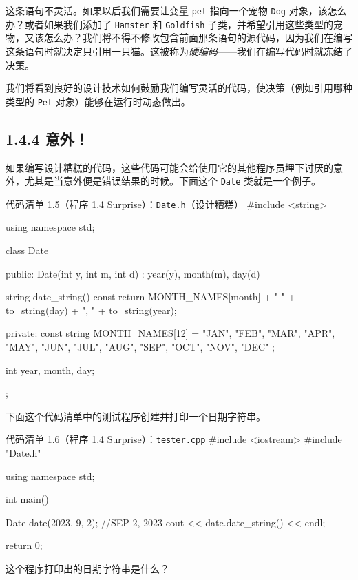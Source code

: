 这条语句不灵活。如果以后我们需要让变量 \texttt{pet} 指向一个宠物 \texttt{Dog} 对象，该怎么办？或者如果我们添加了 \texttt{Hamster} 和 \texttt{Goldfish} 子类，并希望引用这些类型的宠物，又该怎么办？我们将不得不修改包含前面那条语句的源代码，因为我们在编写这条语句时就决定只引用一只猫。这被称为\emph{硬编码}——我们在编写代码时就冻结了决策。

我们将看到良好的设计技术如何鼓励我们编写灵活的代码，使决策（例如引用哪种类型的 \texttt{Pet} 对象）能够在运行时动态做出。

\subsection{1.4.4 意外！}

如果编写设计糟糕的代码，这些代码可能会给使用它的其他程序员埋下讨厌的意外，尤其是当意外便是错误结果的时候。下面这个 \texttt{Date} 类就是一个例子。

\begin{codeboxt}{代码清单 1.5（程序 1.4 Surprise）：\texttt{Date.h}（设计糟糕）}
#include <string>

using namespace std;

class Date
{
public:
    Date(int y, int m, int d) : year(y), month(m), day(d) {}
        
    string date_string() const
    {
        return MONTH_NAMES[month] + " "  + to_string(day)
                                  + ", " + to_string(year);
    }
        
private:
    const string MONTH_NAMES[12] =
    {
        "JAN", "FEB", "MAR", "APR", "MAY", "JUN",
        "JUL", "AUG", "SEP", "OCT", "NOV", "DEC"
    };
        
    int year, month, day;
};
\end{codeboxt}

下面这个代码清单中的测试程序创建并打印一个日期字符串。

\begin{codeboxt}{代码清单 1.6（程序 1.4 Surprise）：\texttt{tester.\allowbreak{}cpp}}
#include <iostream>
#include "Date.h"

using namespace std;

int main()
{
    Date date(2023, 9, 2);  //SEP 2, 2023
    cout << date.date_string() << endl;
 
    return 0;
}
\end{codeboxt}

这个程序打印出的日期字符串是什么？


